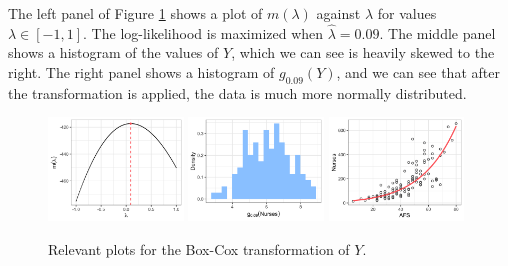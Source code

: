 \documentclass[10pt]{article}
\begin{document}
\begin{itemize}
    The left panel of Figure \ref{q01-box-cox} shows a plot of \(m(\lambda)\) against \(\lambda\) for values \(\lambda \in [-1, 1]\). The log-likelihood is maximized when \(\hat{\lambda} = 0.09\).
    The middle panel shows a histogram of the values of \(Y\), which we can see is heavily skewed to the right. The right panel shows a histogram of \(g_{0.09}(Y)\), and we can see that 
    after the transformation is applied, the data is much more normally distributed. 
    \begin{figure}
        \centering
        \includegraphics[width = 0.32\textwidth]{img/q01-box-cox-lambda.png}
        \includegraphics[width = 0.32\textwidth]{img/q01-nurses-hist-transformed.png}
        \includegraphics[width = 0.32\textwidth]{img/q01-scatterplot-model.png}
        \caption{Relevant plots for the Box-Cox transformation of \(Y\).}
        \label{q01-box-cox}
    \end{figure}
\end{itemize}
\end{document}
